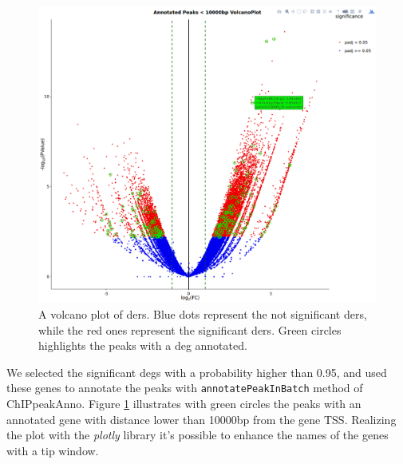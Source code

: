 \begin{figure}[h]
\centering
\includegraphics[width=\textwidth, height=\textheight, keepaspectratio]{img/descan2/Annotated_depeaks_degenes.png}
\caption[Annotated Differential Enrichment Regions Volcano]{A volcano plot of \glspl{der}. Blue dots represent the not significant \glspl{der}, while the red ones represent the significant \glspl{der}. Green circles highlights the peaks with a \gls{deg} annotated.}
\label{fig:depeakdegenessdescan}
\centering
\end{figure}

We selected the significant \glspl{deg} with a probability higher than 0.95, and used these genes to annotate the peaks with \lstinline{annotatePeakInBatch} method of ChIPpeakAnno.
Figure 	\ref{fig:depeakdegenessdescan} illustrates with green circles the peaks with an annotated gene with distance lower than 10000bp from the gene TSS.
Realizing the plot with the \textit{plotly} library it's possible to enhance the names of the genes with a tip window.









